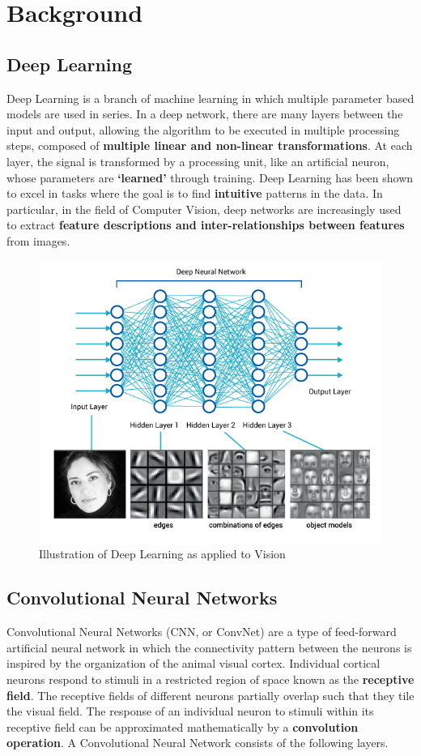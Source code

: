 \documentclass[12pt]{article}
\begin{document}
	\section{Background} 
			\subsection{Deep Learning}
				Deep Learning is a branch of machine learning in which multiple parameter based models are used in series. In a deep network, there are many layers between the input and output, allowing the algorithm to be executed in multiple processing steps, composed of \textbf{multiple linear and non-linear transformations}. At each layer, the signal is transformed by a processing unit, like an artificial neuron, whose parameters are \textbf{`learned'} through training. Deep Learning has been shown to excel in tasks where the goal is to find \textbf{intuitive} patterns in the data.\cite{deep} In particular, in the field of Computer Vision, deep networks are increasingly used to extract \textbf{feature descriptions and inter-relationships between features} from images.\cite{cs231n}
				\begin{figure}[ht!]
					\includegraphics[width=14cm]{blog_deeplearning3.jpg}
					\caption{Illustration of Deep Learning as applied to Vision\label{fig2}}
				\end{figure}	

			\subsection{Convolutional Neural Networks}
			Convolutional Neural Networks (CNN, or ConvNet) are a type of feed-forward artificial neural network in which the connectivity pattern between the neurons is inspired by the organization of the animal visual cortex. Individual cortical neurons respond to stimuli in a restricted region of space known as the \textbf{receptive field}. The receptive fields of different neurons partially overlap such that they tile the visual field. The response of an individual neuron to stimuli within its receptive field can be approximated mathematically by a \textbf{convolution operation}. A Convolutional Neural Network consists of the following layers.\cite{showandtell}
								
\end{document}
